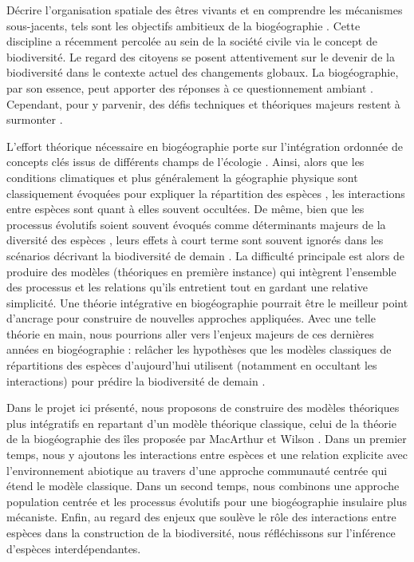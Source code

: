 Décrire l'organisation spatiale des êtres vivants et en comprendre les
mécanismes sous-jacents, tels sont les objectifs ambitieux de la
biogéographie \cite{MacArthur1967}. Cette discipline a récemment
percolée au sein de la société civile via le concept de biodiversité. Le
regard des citoyens se posent attentivement sur le devenir de la
biodiversité dans le contexte actuel des changements globaux. La
biogéographie, par son essence, peut apporter des réponses à ce
questionnement ambiant \cite{Whittaker2005}. Cependant, pour y parvenir,
des défis techniques et théoriques majeurs restent à surmonter
\cite{Beck2012}.

L'effort théorique nécessaire en biogéographie porte sur l'intégration
ordonnée de concepts clés issus de différents champs de l'écologie
\cite{Thuiller2013}. Ainsi, alors que les conditions climatiques et plus
généralement la géographie physique sont classiquement évoquées pour
expliquer la répartition des espèces \cite{Kearney2004}, les
interactions entre espèces sont quant à elles souvent occultées. De
même, bien que les processus évolutifs soient souvent évoqués comme
déterminants majeurs de la diversité des espèces \cite{Rosindell2011},
leurs effets à court terme sont souvent ignorés \cite{Parmesan2006} dans
les scénarios décrivant la biodiversité de demain \cite{Lavergne2010}.
La difficulté principale est alors de produire des modèles (théoriques
en première instance) qui intègrent l'ensemble des processus et les
relations qu'ils entretient \cite{Thuiller2013} tout en gardant une
relative simplicité. Une théorie intégrative en biogéographie pourrait
être le meilleur point d'ancrage pour construire de nouvelles approches
appliquées. Avec une telle théorie en main, nous pourrions aller vers
l'enjeux majeurs de ces dernières années en biogéographie : relâcher les
hypothèses que les modèles classiques de répartitions des espèces
d'aujourd'hui utilisent (notamment en occultant les interactions) pour
prédire la biodiversité de demain \cite{Guisan2011}.

Dans le projet ici présenté, nous proposons de construire des modèles
théoriques plus intégratifs en repartant d'un modèle théorique
classique, celui de la théorie de la biogéographie des îles proposée par
MacArthur et Wilson \cite{MacArthur1967}. Dans un premier temps, nous y
ajoutons les interactions entre espèces et une relation explicite avec
l'environnement abiotique au travers d'une approche communauté centrée
qui étend le modèle classique. Dans un second temps, nous combinons une
approche population centrée et les processus évolutifs pour une
biogéographie insulaire plus mécaniste. Enfin, au regard des enjeux que
soulève le rôle des interactions entre espèces dans la construction de
la biodiversité, nous réfléchissons sur l'inférence d'espèces
interdépendantes.

